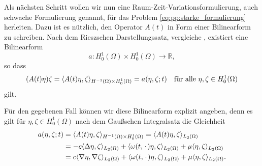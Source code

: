 Als nächsten Schritt wollen wir nun eine Raum-Zeit-Variationsformulierung, auch schwache Formulierung genannt, für das Problem  \eqref{eq:pp:starke_formulierung} herleiten.
Dazu ist es nützlich, den Operator $A(t)$ in Form einer Bilinearform zu schreiben.
Nach dem Rieszschen Darstellungssatz, vergleiche \cite[Theorem \S{}22.1]{Halmos:1957vd}, existiert eine Bilinearform
\begin{equation}
    a \colon H^{1}_{0}(\Omega) \times H^{1}_{0}(\Omega) \to \mathbb{R},
\end{equation}
so dass
\begin{equation}
    (A(t)\eta)\zeta = \skp{A(t)\eta}{\zeta}{H^{-1}(\Omega) \times H^{1}_{0}(\Omega)} = a(\eta, \zeta; t) \quad \fa \eta, \zeta \in H^{1}_{0}(\Omega)
\end{equation}
gilt.


Für den gegebenen Fall können wir diese Bilinearform explizit angeben, denn es gilt für $\eta, \zeta \in H^{1}_{0}(\Omega)$ nach dem Gaußschen Integralsatz die Gleichheit
\begin{equation}
    \begin{aligned}
        a(\eta, \zeta; t)
        &=    \skp{A(t)\eta}{\zeta}{H^{-1}(\Omega) \times H^{1}_{0}(\Omega)}
        =  \skp{A(t)\eta}{\zeta}{L_{2}(\Omega)}
        \\&= - c \skp{\Delta \eta}{\zeta}{L_{2}(\Omega)}
                + \skp{\omega(t, \blank) \eta}{\zeta}{L_{2}(\Omega)}
                + \mu \skp{\eta}{\zeta}{L_{2}(\Omega)}
        \\&= c \skp{\grad \eta}{\grad \zeta}{L_{2}(\Omega)}
                + \skp{\omega(t, \blank) \eta}{\zeta}{L_{2}(\Omega)}
                + \mu \skp{\eta}{\zeta}{L_{2}(\Omega)}.
    \end{aligned}
\end{equation}

